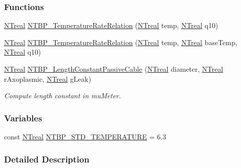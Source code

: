 \subsubsection*{Functions}
\begin{DoxyCompactItemize}
\item 
\hyperlink{nt__types_8h_a814a97893e9deb1eedcc7604529ba80d}{NTreal} \hyperlink{ntbp__object__obj_8h_af4bacc28c4d517b98cae8121b086b297}{NTBP\_\-TemperatureRateRelation} (\hyperlink{nt__types_8h_a814a97893e9deb1eedcc7604529ba80d}{NTreal} temp, \hyperlink{nt__types_8h_a814a97893e9deb1eedcc7604529ba80d}{NTreal} q10)
\item 
\hyperlink{nt__types_8h_a814a97893e9deb1eedcc7604529ba80d}{NTreal} \hyperlink{ntbp__object__obj_8h_a6dc5e1183b4d96ff0f13b548910bb100}{NTBP\_\-TemperatureRateRelation} (\hyperlink{nt__types_8h_a814a97893e9deb1eedcc7604529ba80d}{NTreal} temp, \hyperlink{nt__types_8h_a814a97893e9deb1eedcc7604529ba80d}{NTreal} baseTemp, \hyperlink{nt__types_8h_a814a97893e9deb1eedcc7604529ba80d}{NTreal} q10)
\item 
\hyperlink{nt__types_8h_a814a97893e9deb1eedcc7604529ba80d}{NTreal} \hyperlink{ntbp__object__obj_8h_ae8f8e4437974c328ceef488c585de659}{NTBP\_\-LengthConstantPassiveCable} (\hyperlink{nt__types_8h_a814a97893e9deb1eedcc7604529ba80d}{NTreal} diameter, \hyperlink{nt__types_8h_a814a97893e9deb1eedcc7604529ba80d}{NTreal} rAxoplasmic, \hyperlink{nt__types_8h_a814a97893e9deb1eedcc7604529ba80d}{NTreal} gLeak)
\begin{DoxyCompactList}\small\item\em Compute length constant in muMeter. \item\end{DoxyCompactList}\end{DoxyCompactItemize}
\subsubsection*{Variables}
\begin{DoxyCompactItemize}
\item 
const \hyperlink{nt__types_8h_a814a97893e9deb1eedcc7604529ba80d}{NTreal} \hyperlink{ntbp__object__obj_8h_ae1e1f2403426e1b7148f5145ea0e6faa}{NTBP\_\-STD\_\-TEMPERATURE} = 6.3
\end{DoxyCompactItemize}


\subsubsection{Detailed Description}


